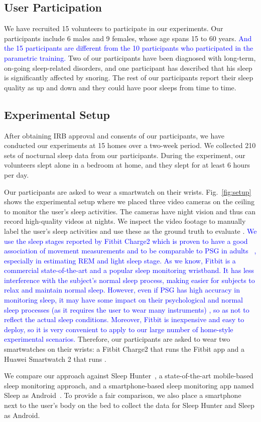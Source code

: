 \subsection{User Participation} We have recruited 15 volunteers to participate in our experiments. Our
participants include 6 males and 9 females, whose age spans 15 to 60 years. \textcolor{blue}{And the 15 participants are different from the 10 participants who participated in the parametric training.} Two of our participants have been diagnosed with long-term,
on-going sleep-related disorders, and one participant has described that his sleep is significantly affected by snoring. The rest of our
participants report their sleep quality as up and down and they could have poor sleeps from time to time.

\subsection{Experimental Setup}
After obtaining IRB approval and consents of our participants, we have conducted our experiments at 15 homes over a two-week period. We
collected 210 sets of nocturnal sleep data from our participants. During the experiment, our volunteers slept alone in a bedroom at
home, and they slept for at least 6 hours per day.


Our participants are asked to wear a smartwatch on their wrists. Fig.~\ref{fig:setup} shows the experimental setup where we placed three
video cameras on the ceiling to monitor the user's sleep activities. The cameras have night vision and thus can record high-quality videos
at nights. We inspect the video footage to manually label the user's sleep activities and use these as the ground truth to evaluate \systemname. \textcolor{blue}{We use the sleep stages reported by Fitbit Charge2 which is proven to have a good association of movement measurements and to be comparable to PSG in adults ~\cite{evenson2015systematic,fitbit01,fitbit02,fitbit03}, especially in estimating REM and light sleep stage. As we know, Fitbit is a commercial state-of-the-art and a popular sleep monitoring wristband. It has less interference with the subject's normal sleep process, making easier for subjects to relax and maintain normal sleep. However, even if PSG has high accuracy in monitoring sleep, it may have some impact on their psychological and normal sleep processes (as it requires the user to wear many instruments) , so as not to reflect the actual sleep conditions. Moreover, Fitbit is inexpensive and easy to deploy, so it is very convenient to apply to our large number of home-style experimental scenarios.} Therefore, our participants are asked to wear two smartwatches on their wrists: a Fitbit Charge2 that runs the Fitbit app and a Huawei Smartwatch 2 that runs \systemname.

We compare our approach against Sleep Hunter~\cite{gu2016sleep}, a state-of-the-art mobile-based sleep monitoring approach, and a
smartphone-based sleep monitoring app named Sleep as Android~\cite{SleepAndroid}. To provide a fair comparison, we also place a smartphone
next to the user's body on the bed to collect the data for Sleep Hunter and Sleep as Android.
